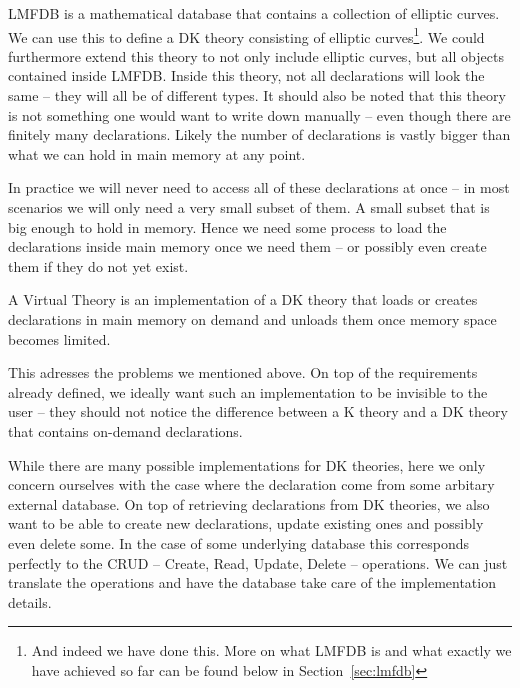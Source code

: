LMFDB is a mathematical database that contains a collection of elliptic curves. We can use
this to define a DK theory consisting of elliptic curves\footnote{And indeed we have done
  this. More on what LMFDB is and what exactly we have achieved so far can be found below
  in Section~\ref{sec:lmfdb}}. We could furthermore extend this theory to not only include
elliptic curves, but all objects contained inside LMFDB. Inside this theory, not all
declarations will look the same -- they will all be of different types. It should also be
noted that this theory is not something one would want to write down manually -- even
though there are finitely many declarations. Likely the number of declarations is vastly
bigger than what we can hold in main memory at any point.

In practice we will never need to access all of these declarations at once -- in most
scenarios we will only need a very small subset of them. A small subset that is big enough
to hold in memory. Hence we need some process to load the declarations inside main memory
once we need them -- or possibly even create them if they do not yet exist.

\begin{mydef}
  A Virtual Theory is an implementation of a DK theory that loads or creates declarations in main memory on demand and unloads them once memory space becomes limited.
\end{mydef}

This adresses the problems we mentioned above. On top of the requirements already defined,
we ideally want such an implementation to be invisible to the user -- they should not
notice the difference between a K theory and a DK theory that contains on-demand
declarations.

While there are many possible implementations for DK theories, here we only concern
ourselves with the case where the declaration come from some arbitary external
database. On top of retrieving declarations from DK theories, we also want to be able to
create new declarations, update existing ones and possibly even delete some. In the case
of some underlying database this corresponds perfectly to the CRUD -- Create, Read,
Update, Delete -- operations. We can just translate the operations and have the database
take care of the implementation details. 


